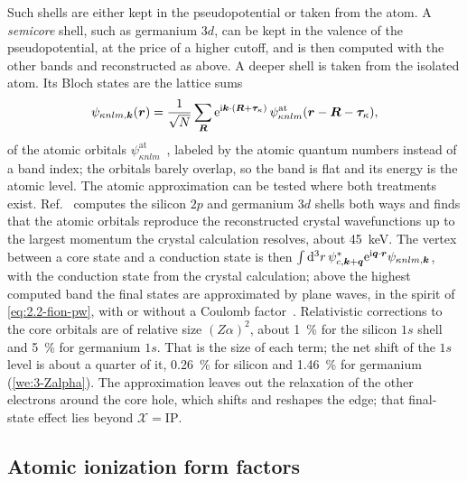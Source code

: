 Such shells are either kept in the pseudopotential or taken from the atom. A \emph{semicore} shell, such as germanium $3d$, can be kept in the valence of the pseudopotential, at the price of a higher cutoff, and is then computed with the other bands and reconstructed as above. A deeper shell is taken from the isolated atom. Its Bloch states are the lattice sums
\begin{equation}
  \psi_{\kappa nlm,\bm{k}}(\bm{r}) = \frac{1}{\sqrt N}\sum_{\bm{R}}\mathrm{e}^{\mathrm{i}\bm{k}\cdot(\bm{R}+\bm{\tau}_\kappa)}\,\psi^{\mathrm{at}}_{\kappa nlm}(\bm{r} - \bm{R} - \bm{\tau}_\kappa) ,
  \label{eq:E.7-core}
\end{equation}
of the atomic orbitals $\psi^{\mathrm{at}}_{\kappa nlm}$~\cite[Eq.~(2.8)]{griffin2021extended}, labeled by the atomic quantum numbers instead of a band index; the orbitals barely overlap, so the band is flat and its energy is the atomic level. The atomic approximation can be tested where both treatments exist. Ref.~\cite[Sect.~2.2]{griffin2021extended} computes the silicon $2p$ and germanium $3d$ shells both ways and finds that the atomic orbitals reproduce the reconstructed crystal wavefunctions up to the largest momentum the crystal calculation resolves, about \SI{45}{keV}. The vertex between a core state and a conduction state is then $\int\mathrm{d}^3r\,\psi^*_{c,\bm{k}+\bm{q}}\mathrm{e}^{\mathrm{i}\bm{q}\cdot\bm{r}}\psi_{\kappa nlm,\bm{k}}$, with the conduction state from the crystal calculation; above the highest computed band the final states are approximated by plane waves, in the spirit of \cref{eq:2.2-fion-pw}, with or without a Coulomb factor~\cite[Sects.~2.3 and~3.4]{griffin2021extended}. Relativistic corrections to the core orbitals are of relative size $(Z\alpha)^2$, about \SI{1}{\percent} for the silicon $1s$ shell and \SI{5}{\percent} for germanium $1s$. That is the size of each term; the net shift of the $1s$ level is about a quarter of it, \SI{0.26}{\percent} for silicon and \SI{1.46}{\percent} for germanium (\cref{we:3-Zalpha}). The approximation leaves out the relaxation of the other electrons around the core hole, which shifts and reshapes the edge; that final-state effect lies beyond $\mathcal{X} = \mathrm{IP}$.

\subsection{Atomic ionization form factors}

